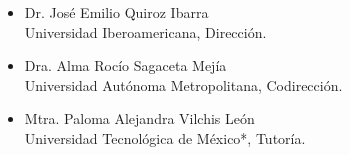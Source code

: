 \begin{itemize}
	\item Dr. José Emilio Quiroz Ibarra\\
	Universidad Iberoamericana, Dirección.
	\item Dra. Alma Rocío Sagaceta Mejía\\
	Universidad Autónoma Metropolitana, Codirección.
	\item Mtra. Paloma Alejandra Vilchis León\\
	Universidad Tecnológica de México*, Tutoría.
\end{itemize}